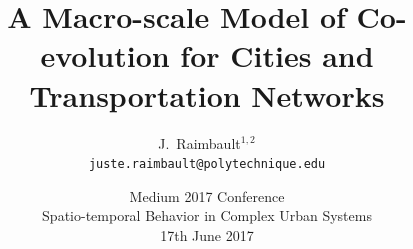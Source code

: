 \documentclass[english,11pt]{beamer}
\begin{document}
\title{A Macro-scale Model of Co-evolution for Cities and Transportation Networks}

\author{J.~Raimbault$^{1,2}$\\
\texttt{juste.raimbault@polytechnique.edu}
}




\date{Medium 2017 Conference\\\smallskip
Spatio-temporal Behavior in Complex Urban Systems\\\smallskip
17th June 2017
}


{




\frame{\maketitle}

}




\end{document}
